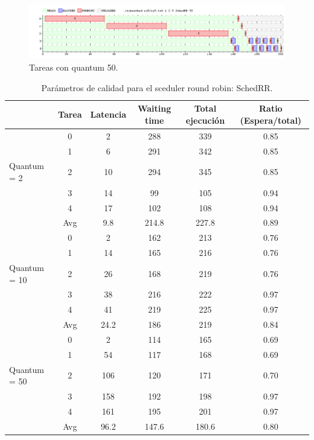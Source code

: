 \begin{figure}[h]
  \includegraphics[width=\textwidth]{../ej5/ej5RR12050.png}
  \caption{Tareas con quantum 50.}
\end{figure}















 \begin{table}[h!]
 	\begin{center}
 		\caption{Parámetros de calidad para el sceduler round robin: SchedRR.}
 		\label{tab:table1}
 		\begin{tabular}{|l|c|c|c|c|c|}
 			\hline
 			& Tarea & Latencia & Waiting time & Total ejecución & Ratio (Espera/total) \\
 			\hline
 			\hline
 			& 0 & 2 & 288 & 339 & 0.85\\ \cline{2-6}
 			& 1 & 6 & 291 & 342 & 0.85 \\ \cline{2-6}
 			Quantum = 2 & 2 & 10 & 294 & 345 & 0.85 \\ \cline{2-6}
 			& 3 & 14 & 99 & 105 & 0.94 \\ \cline{2-6}
 			& 4 & 17 & 102 & 108 & 0.94 \\ \cline{2-6}
 			& Avg & 9.8 & 214.8 & 227.8 & 0.89 \\
 			\hline
 			\hline
 			& 0 & 2 & 162 & 213 & 0.76 \\ \cline{2-6}
 			& 1 & 14 & 165 & 216 & 0.76 \\ \cline{2-6}
 			Quantum = 10 & 2 & 26 & 168 & 219 & 0.76 \\ \cline{2-6}
 			& 3 & 38 & 216 & 222 & 0.97 \\ \cline{2-6}
 			& 4 & 41 & 219 & 225 & 0.97 \\ \cline{2-6}
 			& Avg & 24.2 & 186 & 219 & 0.84 \\
 			\hline
 			\hline
 			& 0 & 2 & 114 & 165 & 0.69 \\ \cline{2-6}
 			& 1 & 54 & 117 & 168 & 0.69 \\ \cline{2-6}
 			Quantum = 50 & 2 & 106 & 120 & 171 & 0.70\\ \cline{2-6}
 			& 3 & 158 & 192 & 198 & 0.97 \\ \cline{2-6}
 			& 4 & 161 & 195 & 201 & 0.97 \\ \cline{2-6}
 			& Avg & 96.2 & 147.6 & 180.6 & 0.80 \\
 			\hline
 		\end{tabular}
 	\end{center}
 \end{table}


\clearpage   %
